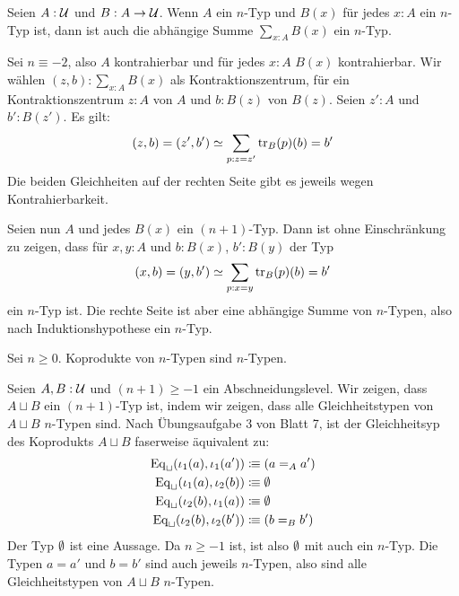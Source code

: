 \begin{lemma}
  \label{lem:sum-n-type}
  Seien $A:\mathcal{U}$ und $B:A\to\mathcal{U}$. Wenn $A$ ein $n$-Typ und $B(x)$ für jedes $x:A$ ein $n$-Typ ist, dann ist auch die abhängige Summe $\sum_{x:A}B(x)$ ein $n$-Typ.
\end{lemma}
\begin{beweis}
  Sei $n\equiv -2$, also $A$ kontrahierbar und für jedes $x:A$ $B(x)$ kontrahierbar.
  Wir wählen $(z,b):\sum_{x:A}B(x)$ als Kontraktionszentrum, für ein Kontraktionszentrum $z:A$ von $A$ und $b:B(z)$ von $B(z)$.
  Seien $z':A$ und $b':B(z')$. Es gilt:
  \[
    (z,b)=(z',b') \simeq \sum_{p:z=z'}\mathrm{tr}_B(p)(b)=b'
  \]
  Die beiden Gleichheiten auf der rechten Seite gibt es jeweils wegen Kontrahierbarkeit.

  Seien nun $A$ und jedes $B(x)$ ein $(n+1)$-Typ. Dann ist ohne Einschränkung zu zeigen, dass für $x,y:A$ und $b:B(x)$, $b':B(y)$ der Typ
  \[
    (x,b)=(y,b') \simeq \sum_{p:x=y}\mathrm{tr}_B(p)(b)=b'
  \]
  ein $n$-Typ ist. Die rechte Seite ist aber eine abhängige Summe von $n$-Typen, also nach Induktionshypothese ein $n$-Typ.
\end{beweis}

\begin{bemerkung}
  Sei $n\geq 0$. Koprodukte von $n$-Typen sind $n$-Typen.
\end{bemerkung}
\begin{beweis}
  Seien $A,B:\mathcal{U}$ und $(n+1)\geq -1$ ein Abschneidungslevel.
  Wir zeigen, dass $A\sqcup B$ ein $(n+1)$-Typ ist, indem wir zeigen, dass alle Gleichheitstypen von $A\sqcup B$ $n$-Typen sind.
  Nach Übungsaufgabe 3 von Blatt 7, ist der Gleichheitsyp des Koprodukts $A\sqcup B$ faserweise äquivalent zu:
  \begin{align*}
    \mathrm{Eq}_{\sqcup}(\iota_1(a),\iota_1(a'))&\vcentcolon\mspace{-1.2mu}\equiv (a=_A a') \\
    \mathrm{Eq}_{\sqcup}(\iota_1(a),\iota_2(b))&\vcentcolon\mspace{-1.2mu}\equiv \emptyset \\
    \mathrm{Eq}_{\sqcup}(\iota_2(b),\iota_1(a))&\vcentcolon\mspace{-1.2mu}\equiv \emptyset \\
    \mathrm{Eq}_{\sqcup}(\iota_2(b),\iota_2(b'))&\vcentcolon\mspace{-1.2mu}\equiv (b=_B b')
  \end{align*}
  Der Typ $\emptyset$ ist eine Aussage. Da $n\geq -1$ ist, ist also $\emptyset$ mit  auch ein $n$-Typ.
  Die Typen $a=a'$ und $b=b'$ sind auch jeweils $n$-Typen, also sind alle Gleichheitstypen von $A\sqcup B$ $n$-Typen.
\end{beweis}

